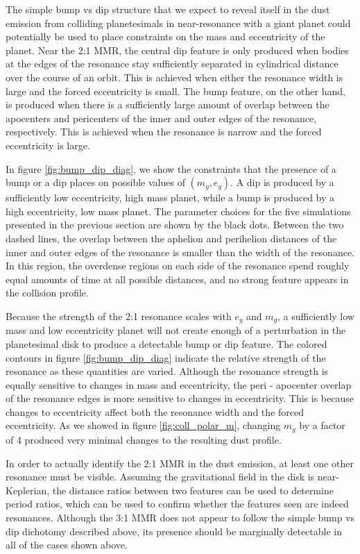 \documentclass[twocolumn]{aastex63}
\begin{document}
The simple bump vs dip structure that we expect to reveal itself in the dust emission from colliding planetesimals in near-resonance with a giant 
planet could potentially be used to place constraints on the mass and eccentricity of the planet. Near the 2:1 MMR, the central dip feature is only 
produced when bodies at the edges of the resonance stay sufficiently separated in cylindrical distance over the course of an orbit. This is achieved 
when either the resonance width is large and the forced eccentricity is small. The bump feature, on the other hand, is produced when there is a 
sufficiently large amount of overlap between the apocenters and pericenters of the inner and outer edges of the resonance, respectively. This is 
achieved when the resonance is narrow and the forced eccentricity is large.

In figure \ref{fig:bump_dip_diag}, we show the constraints that the presence of a bump or a dip places on possible values of $(m_{g}, e_{g})$. A dip 
is produced by a sufficiently low eccentricity, high mass planet, while a bump is produced by a high eccentricity, low mass planet. The parameter 
choices for the five simulations presented in the previous section are shown by the black dots. Between the two dashed lines, the overlap between 
the aphelion and perihelion distances of the inner and outer edges of the resonance is smaller than the width of the resonance. In this region, the 
overdense regions on each side of the resonance spend roughly equal amounts of time at all possible distances, and no strong feature appears in 
the collision profile.

Because the strength of the 2:1 resonance scales with $e_{g}$ and  $m_{g}$, a sufficiently low mass and low eccentricity planet will not create 
enough of a perturbation in the planetesimal disk to produce a detectable bump or dip feature. The colored contours in figure \ref{fig:bump_dip_diag} 
indicate the relative strength of the resonance as these quantities are varied. Although the resonance strength is equally sensitive to changes in 
mass and eccentricity, the peri - apocenter overlap of the resonance edges is more sensitive to changes in eccentricity. This is because changes to 
eccentricity affect both the resonance width and the forced eccentricity. As we showed in figure \ref{fig:coll_polar_m}, changing $m_{g}$ by a factor 
of 4 produced very minimal changes to the resulting dust profile.

In order to actually identify the 2:1 MMR in the dust emission, at least one other resonance must be visible. Assuming the gravitational field in the 
disk is near-Keplerian, the distance ratios between two features can be used to determine period ratios, which can be used to confirm whether the 
features seen are indeed resonances. Although the 3:1 MMR does not appear to follow the simple bump vs dip dichotomy described above, its 
presence should be marginally detectable in all of the cases shown above.
\end{document}
